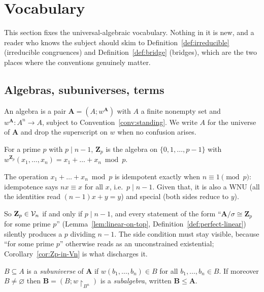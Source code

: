 \section{Vocabulary}\label{sec:vocabulary}

This section fixes the universal-algebraic vocabulary. Nothing in it is new,
and a reader who knows the subject should skim to
Definition~\ref{def:irreducible} (irreducible congruences) and
Definition~\ref{def:bridge} (bridges), which are the two places where the
conventions genuinely matter.

\subsection{Algebras, subuniverses, terms}

\begin{definition}[Algebra]\label{def:algebra}
An algebra is a pair $\mathbf A=(A;w^{\mathbf A})$ with $A$ a finite nonempty
set and $w^{\mathbf A}\colon A^{n}\to A$, subject to
Convention~\ref{conv:standing}. We write $A$ for the universe of $\mathbf A$
and drop the superscript on $w$ when no confusion arises.
\end{definition}

\begin{definition}\label{def:Zp}
For a prime $p$ with $p\mid n-1$, $\mathbf Z_{p}$ is the algebra on
$\{0,1,\dots,p-1\}$ with $w^{\mathbf Z_{p}}(x_{1},\dots,x_{n})
=x_{1}+\dots+x_{n}\bmod p$.
\end{definition}

\begin{hazard}\label{haz:Zp}
The operation $x_{1}+\dots+x_{n}\bmod p$ is idempotent exactly when
$n\equiv1\pmod p$: idempotence says $nx\equiv x$ for all $x$, i.e.\
$p\mid n-1$. Given that, it is also a WNU (all the identities read
$(n-1)x+y=y$) and special (both sides reduce to $y$).

So $\mathbf Z_{p}\in\mathcal V_{n}$ if and only if $p\mid n-1$, and every statement of the
form ``$\mathbf A/\sigma\cong\mathbf Z_{p}$ for some prime $p$''
(Lemma~\ref{lem:linear-on-top}, Definition~\ref{def:perfect-linear}) silently
produces a $p$ dividing $n-1$. The side condition must stay visible, because
``for some prime $p$'' otherwise reads as an unconstrained existential;
Corollary~\ref{cor:Zp-in-Vn} is what discharges it.
\end{hazard}

\begin{definition}\label{def:subuniverse}
$B\subseteq A$ is a \emph{subuniverse} of $\mathbf A$ if
$w(b_{1},\dots,b_{n})\in B$ for all $b_{1},\dots,b_{n}\in B$. If moreover
$B\neq\varnothing$ then $\mathbf B=(B;w\!\restriction_{B^{n}})$ is a
\emph{subalgebra}, written $\mathbf B\le\mathbf A$.
\end{definition}

